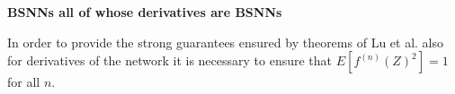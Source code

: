 \documentclass{letter}
\begin{document}








\begin{center}
{\bf BSNNs all of whose derivatives are BSNNs}
\end{center}

In order to provide the strong guarantees ensured by theorems of Lu et al. also for derivatives of the network it is necessary to ensure that $E[f^{(n)}(Z)^2]=1$ for all $n$.
\end{document}
